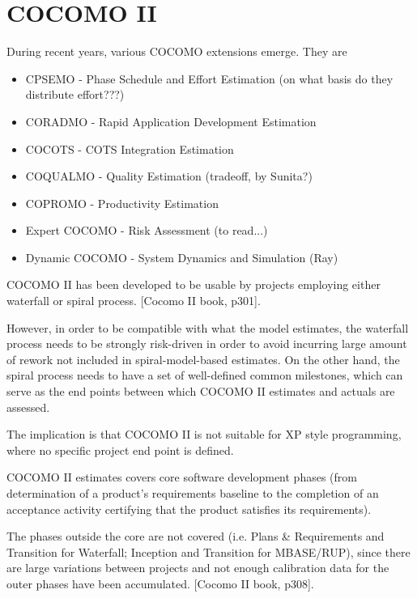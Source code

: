 \section{COCOMO II}

During recent years, various COCOMO extensions emerge. They are
\begin{itemize}
  \item CPSEMO - Phase Schedule and Effort Estimation (on what basis do
they distribute effort???)
  \item CORADMO - Rapid Application Development Estimation
  \item COCOTS - COTS Integration Estimation
  \item COQUALMO - Quality Estimation (tradeoff, by Sunita?)
  \item COPROMO - Productivity Estimation
  \item Expert COCOMO - Risk Assessment (to read...)
  \item Dynamic COCOMO - System Dynamics and Simulation (Ray)
\end{itemize}

COCOMO II has been developed to be usable by projects employing
either waterfall or spiral process. [Cocomo II book, p301].

However, in order to be compatible with what the model estimates,
the waterfall process needs to be strongly risk-driven in order to
avoid incurring large amount of rework not included in
spiral-model-based estimates. On the other hand, the spiral
process needs to have a set of well-defined common milestones,
which can serve as the end points between which COCOMO II
estimates and actuals are assessed.

The implication is that COCOMO II is not suitable for XP style
programming, where no specific project end point is defined.



COCOMO II estimates covers core software development phases (from
determination of a product's requirements baseline to the
completion of an acceptance activity certifying that the product
satisfies its requirements).

The phases outside the core are not covered (i.e. Plans \&
Requirements and Transition for Waterfall; Inception and
Transition for MBASE/RUP), since there are large variations
between projects and not enough calibration data for the outer
phases have been accumulated. [Cocomo II book, p308].

